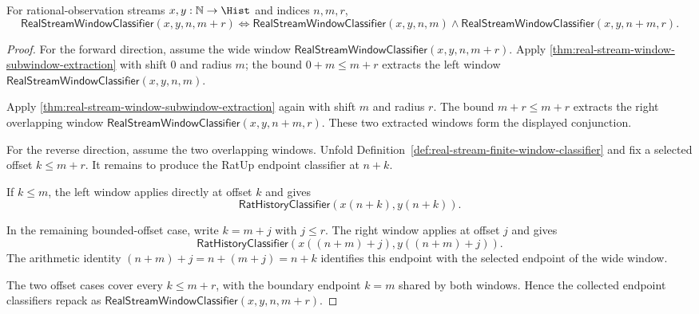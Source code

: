 \begin{theorem}
\label{thm:real-stream-window-overlap-partition}
For rational-observation streams $x,y:\mathbb{N}\to\Hist$ and indices
$n,m,r$,
$$
\mathsf{RealStreamWindowClassifier}(x,y,n,m+r)
\Longleftrightarrow
\mathsf{RealStreamWindowClassifier}(x,y,n,m)\land
\mathsf{RealStreamWindowClassifier}(x,y,n+m,r).
$$
\end{theorem}
\begin{proof}
For the forward direction, assume the wide window
$\mathsf{RealStreamWindowClassifier}(x,y,n,m+r)$. Apply
\autoref{thm:real-stream-window-subwindow-extraction} with shift $0$ and
radius $m$; the bound $0+m\le m+r$ extracts the left window
$\mathsf{RealStreamWindowClassifier}(x,y,n,m)$.

Apply \autoref{thm:real-stream-window-subwindow-extraction} again with shift
$m$ and radius $r$. The bound $m+r\le m+r$ extracts the right overlapping
window $\mathsf{RealStreamWindowClassifier}(x,y,n+m,r)$. These two extracted
windows form the displayed conjunction.

For the reverse direction, assume the two overlapping windows. Unfold
Definition~\ref{def:real-stream-finite-window-classifier} and fix a selected
offset $k\le m+r$. It remains to produce the RatUp endpoint classifier at
$n+k$.

If $k\le m$, the left window applies directly at offset $k$ and gives
$$
\mathsf{RatHistoryClassifier}(x(n+k),y(n+k)).
$$

In the remaining bounded-offset case, write $k=m+j$ with $j\le r$. The right
window applies at offset $j$ and gives
$$
\mathsf{RatHistoryClassifier}(x((n+m)+j),y((n+m)+j)).
$$
The arithmetic identity $(n+m)+j=n+(m+j)=n+k$ identifies this endpoint with
the selected endpoint of the wide window.

The two offset cases cover every $k\le m+r$, with the boundary endpoint
$k=m$ shared by both windows. Hence the collected endpoint classifiers repack
as $\mathsf{RealStreamWindowClassifier}(x,y,n,m+r)$.
\end{proof}

